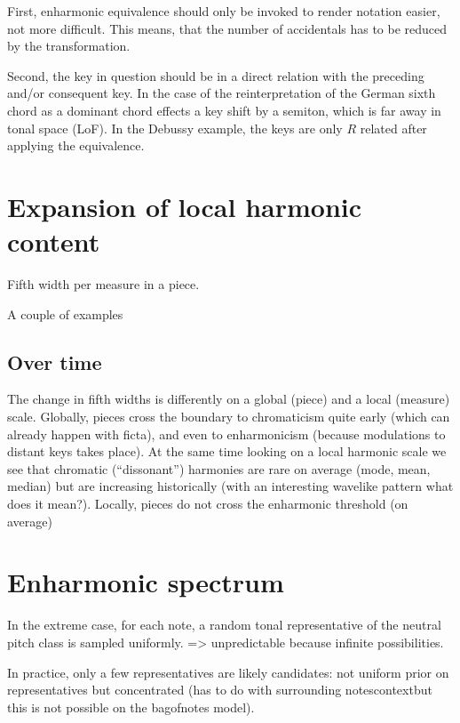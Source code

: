 \documentclass[letterpaper,10pt,english]{sphinxmanual}
\begin{document}
\sphinxAtStartPar
First, enharmonic equivalence should only be invoked to render notation
easier, not more difficult. This means, that the number of accidentals
has to be reduced by the transformation.

\sphinxAtStartPar
Second, the key in question should be in a direct relation with the
preceding and/or consequent key. In the case of the reinterpretation of
the German sixth chord as a dominant chord effects a key shift by a
semiton, which is far away in tonal space (LoF). In the Debussy example,
the keys are only \(R\) related after applying the equivalence.


\section{Expansion of local harmonic content}
\label{\detokenize{5_notes:expansion-of-local-harmonic-content}}
\sphinxAtStartPar
Fifth width per measure in a piece.

\sphinxAtStartPar
A couple of examples


\subsection{Over time}
\label{\detokenize{5_notes:over-time}}
\sphinxAtStartPar
The change in fifth widths is differently on a global (piece) and a
local (measure) scale. Globally, pieces cross the boundary to
chromaticism quite early (which can already happen with ficta), and even
to enharmonicism (because modulations to distant keys takes place). At
the same time looking on a local harmonic scale we see that chromatic
(“dissonant”) harmonies are rare on average (mode, mean, median) but are
increasing historically (with an interesting wavelike pattern \sphinxhyphen{} what
does it mean?). Locally, pieces do not cross the enharmonic threshold
(on average)


\section{Enharmonic spectrum}
\label{\detokenize{5_notes:enharmonic-spectrum}}
\sphinxAtStartPar
In the extreme case, for each note, a random tonal representative of the
neutral pitch class is sampled uniformly. =\textgreater{} unpredictable because
infinite possibilities.

\sphinxAtStartPar
In practice, only a few representatives are likely candidates: not
uniform prior on representatives but concentrated (has  to do
with surrounding notes\textendash{}context\textendash{}but this is not possible on the
bag\sphinxhyphen{}of\sphinxhyphen{}notes model).
\end{document}
